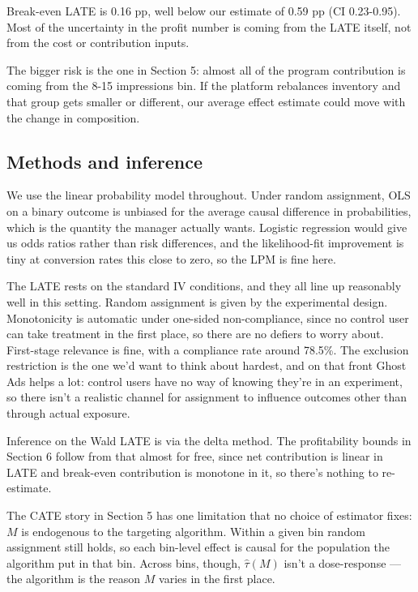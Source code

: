 Break-even LATE is 0.16 pp, well below our estimate of 0.59 pp (CI
0.23-0.95). Most of the uncertainty in the profit number is coming from
the LATE itself, not from the cost or contribution inputs.

The bigger risk is the one in Section 5: almost all of the program
contribution is coming from the 8-15 impressions bin. If the platform
rebalances inventory and that group gets smaller or different, our
average effect estimate could move with the change in composition.

\subsection{Methods and inference}

We use the linear probability model throughout. Under random assignment,
OLS on a binary outcome is unbiased for the average causal difference in
probabilities, which is the quantity the manager actually wants.
Logistic regression would give us odds ratios rather than risk
differences, and the likelihood-fit improvement is tiny at conversion
rates this close to zero, so the LPM is fine here.

The LATE rests on the standard IV conditions, and they all line up
reasonably well in this setting. Random assignment is given by the
experimental design. Monotonicity is automatic under one-sided
non-compliance, since no control user can take treatment in the first
place, so there are no defiers to worry about. First-stage relevance is
fine, with a compliance rate around 78.5\%. The exclusion restriction is
the one we'd want to think about hardest, and on that front Ghost Ads
helps a lot: control users have no way of knowing they're in an
experiment, so there isn't a realistic channel for assignment to
influence outcomes other than through actual exposure.

Inference on the Wald LATE is via the delta method. The profitability
bounds in Section 6 follow from that almost for free, since net
contribution is linear in LATE and break-even contribution is monotone
in it, so there's nothing to re-estimate.

The CATE story in Section 5 has one limitation that no choice of
estimator fixes: \(M\) is endogenous to the targeting algorithm. Within
a given bin random assignment still holds, so each bin-level effect is
causal for the population the algorithm put in that bin. Across bins,
though, \(\hat\tau(M)\) isn't a dose-response --- the algorithm is the
reason \(M\) varies in the first place.

